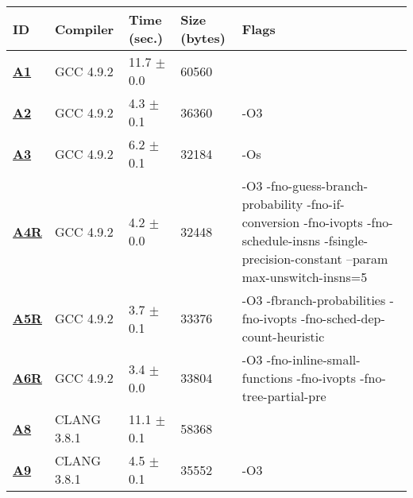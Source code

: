     \begin{tabular}{|l|l|l|l|p{3.2in}|}
     \hline
      \textbf{ID} & \textbf{Compiler} & \textbf{Time (sec.)} & \textbf{Size (bytes)} & \textbf{Flags} \\ 
     \hline
      \textbf{ \href{http://cknowledge.org/repo/web.php?wcid=experiment:f9e6ec8d198c36c3\&subpoint=7cf654adb86fb606}{A1} } &  GCC 4.9.2  &  11.7 $\pm$ 0.0  &  60560  & {\small  }\\
     \hline
      \textbf{ \href{http://cknowledge.org/repo/web.php?wcid=experiment:0b867dd820354a8b\&subpoint=5734f47e4214a783}{A2} } &  GCC 4.9.2  &  4.3 $\pm$ 0.1  &  36360  & {\small -O3 }\\
     \hline
      \textbf{ \href{http://cknowledge.org/repo/web.php?wcid=experiment:b2b26ab783304fc4\&subpoint=7d87c22a2425da10}{A3} } &  GCC 4.9.2  &  6.2 $\pm$ 0.1  &  32184  & {\small -Os }\\
     \hline
      \textbf{ \href{http://cknowledge.org/repo/web.php?wcid=experiment:98688a71f99ac30b\&subpoint=4bcd9dad6b249a79}{A4R} } &  GCC 4.9.2  &  4.2 $\pm$ 0.0  &  32448  & {\small -O3 -fno-guess-branch-probability -fno-if-conversion -fno-ivopts -fno-schedule-insns -fsingle-precision-constant --param max-unswitch-insns=5 }\\
     \hline
      \textbf{ \href{http://cknowledge.org/repo/web.php?wcid=experiment:984b2d8abc3c4415\&subpoint=78c281b4cab897a6}{A5R} } &  GCC 4.9.2  &  3.7 $\pm$ 0.1  &  33376  & {\small -O3 -fbranch-probabilities -fno-ivopts -fno-sched-dep-count-heuristic }\\
     \hline
      \textbf{ \href{http://cknowledge.org/repo/web.php?wcid=experiment:7af17ca204080b57\&subpoint=5a464ecf81b60098}{A6R} } &  GCC 4.9.2  &  3.4 $\pm$ 0.0  &  33804  & {\small -O3 -fno-inline-small-functions -fno-ivopts -fno-tree-partial-pre }\\
     \hline
      \textbf{ \href{http://cknowledge.org/repo/web.php?wcid=experiment:a32e34c31b900930\&subpoint=64ec888d2e6a0669}{A8} } &  CLANG 3.8.1  &  11.1 $\pm$ 0.1  &  58368  & {\small  }\\
     \hline
      \textbf{ \href{http://cknowledge.org/repo/web.php?wcid=experiment:99141b3313132494\&subpoint=a63f42ac837e38d0}{A9} } &  CLANG 3.8.1  &  4.5 $\pm$ 0.1  &  35552  & {\small -O3 }\\
     \hline
    \end{tabular}    